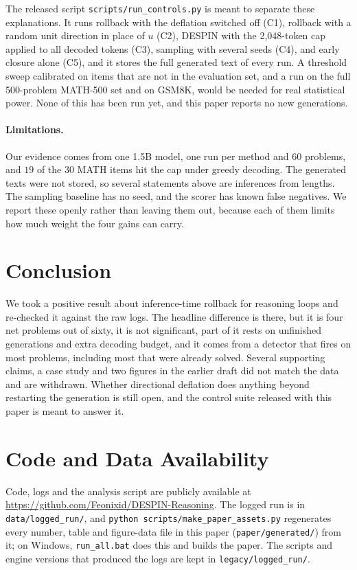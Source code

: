 \documentclass[11pt]{article}
\begin{document}
The released script \texttt{scripts/run\_controls.py} is meant to separate these explanations. It runs rollback with the deflation switched off (C1), rollback with a random unit direction in place of $u$ (C2), DESPIN with the 2{,}048-token cap applied to all decoded tokens (C3), sampling with several seeds (C4), and early closure alone (C5), and it stores the full generated text of every run. A threshold sweep calibrated on items that are not in the evaluation set, and a run on the full 500-problem MATH-500 set and on GSM8K, would be needed for real statistical power. None of this has been run yet, and this paper reports no new generations.

\paragraph{Limitations.} Our evidence comes from one 1.5B model, one run per method and 60 problems, and $19$ of the $30$ MATH items hit the cap under greedy decoding. The generated texts were not stored, so several statements above are inferences from lengths. The sampling baseline has no seed, and the scorer has known false negatives. We report these openly rather than leaving them out, because each of them limits how much weight the four gains can carry.

\section{Conclusion}

We took a positive result about inference-time rollback for reasoning loops and re-checked it against the raw logs. The headline difference is there, but it is four net problems out of sixty, it is not significant, part of it rests on unfinished generations and extra decoding budget, and it comes from a detector that fires on most problems, including most that were already solved. Several supporting claims, a case study and two figures in the earlier draft did not match the data and are withdrawn. Whether directional deflation does anything beyond restarting the generation is still open, and the control suite released with this paper is meant to answer it.

\section*{Code and Data Availability}
{\sloppy Code, logs and the analysis script are publicly available at \url{https://github.com/Feonixid/DESPIN-Reasoning}. The logged run is in \texttt{data/\allowbreak logged\_run/}, and \texttt{python scripts/\allowbreak make\_paper\_\allowbreak assets.py} regenerates every number, table and figure-data file in this paper (\texttt{paper/\allowbreak generated/}) from it; on Windows, \texttt{run\_all.bat} does this and builds the paper. The scripts and engine versions that produced the logs are kept in \texttt{legacy/\allowbreak logged\_run/}.\par}
\end{document}
